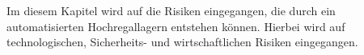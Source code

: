 %
%
%
%
Im diesem Kapitel wird auf die Risiken eingegangen, die durch ein automatisierten Hochregallagern entstehen können.
Hierbei wird auf technologischen, Sicherheits- und  wirtschaftlichen Risiken eingegangen.
